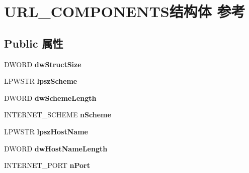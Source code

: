 \hypertarget{struct_u_r_l___c_o_m_p_o_n_e_n_t_s}{}\section{U\+R\+L\+\_\+\+C\+O\+M\+P\+O\+N\+E\+N\+T\+S结构体 参考}
\label{struct_u_r_l___c_o_m_p_o_n_e_n_t_s}
\subsection*{Public 属性}
\begin{DoxyCompactItemize}
\item 
\mbox{\label{struct_u_r_l___c_o_m_p_o_n_e_n_t_s_ae37167c72e75b75f15db3e32250bec11}} 
D\+W\+O\+RD {\bfseries dw\+Struct\+Size}
\item 
\mbox{\label{struct_u_r_l___c_o_m_p_o_n_e_n_t_s_a2310152c3c818237ea643f054eef53d4}} 
L\+P\+W\+S\+TR {\bfseries lpsz\+Scheme}
\item 
\mbox{\label{struct_u_r_l___c_o_m_p_o_n_e_n_t_s_af31b6386906c3e0ddd0b693aad1f5747}} 
D\+W\+O\+RD {\bfseries dw\+Scheme\+Length}
\item 
\mbox{\label{struct_u_r_l___c_o_m_p_o_n_e_n_t_s_ae2f5574b57aff15d4366568a19755f84}} 
I\+N\+T\+E\+R\+N\+E\+T\+\_\+\+S\+C\+H\+E\+ME {\bfseries n\+Scheme}
\item 
\mbox{\label{struct_u_r_l___c_o_m_p_o_n_e_n_t_s_aaaae63be09a1ff5230f3f66437430344}} 
L\+P\+W\+S\+TR {\bfseries lpsz\+Host\+Name}
\item 
\mbox{\label{struct_u_r_l___c_o_m_p_o_n_e_n_t_s_a876cbf3fe8cd3419ab45ef9eda35e1a4}} 
D\+W\+O\+RD {\bfseries dw\+Host\+Name\+Length}
\item 
\mbox{\label{struct_u_r_l___c_o_m_p_o_n_e_n_t_s_a1a746edfa5d6a00a3411ead60af8a0cd}} 
I\+N\+T\+E\+R\+N\+E\+T\+\_\+\+P\+O\+RT {\bfseries n\+Port}
\item 
\mbox{\label{struct_u_r_l___c_o_m_p_o_n_e_n_t_s_a28048aabdc28857cd5dc5e167467d245}} 

\end{DoxyCompactItemize}
